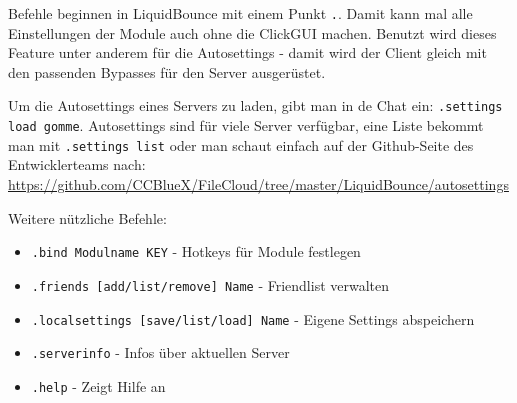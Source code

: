 Befehle beginnen in LiquidBounce mit einem Punkt \texttt{.}. Damit kann mal alle Einstellungen der Module auch ohne die ClickGUI machen. Benutzt wird dieses Feature unter anderem für die Autosettings - damit wird der Client gleich mit den passenden Bypasses für den Server ausgerüstet.

Um die Autosettings eines Servers zu laden, gibt man in de Chat ein: \texttt{.settings load gomme}. Autosettings sind für viele Server verfügbar, eine Liste bekommt man mit \texttt{.settings list} oder man schaut einfach auf der Github-Seite des Entwicklerteams nach: \url{https://github.com/CCBlueX/FileCloud/tree/master/LiquidBounce/autosettings}

Weitere nützliche Befehle:
\begin{itemize}
    \item \texttt{.bind Modulname KEY} - Hotkeys für Module festlegen
    \item \texttt{.friends [add/list/remove] Name} - Friendlist verwalten
    \item \texttt{.localsettings [save/list/load] Name} - Eigene Settings abspeichern
    \item \texttt{.serverinfo} - Infos über aktuellen Server
    \item \texttt{.help} - Zeigt Hilfe an
\end{itemize}